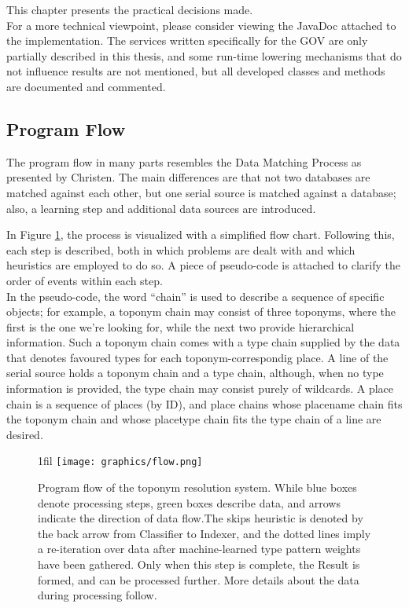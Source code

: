 \documentclass[11pt]{article}
\makeatletter
\newcommand*{\centerfloat}{
  \parindent \z@
  \leftskip \z@ \@plus 1fil \@minus \textwidth
  \rightskip\leftskip
  \parfillskip \z@skip}
\makeatother
\begin{document}
This chapter presents the practical decisions made.\\

For a more technical viewpoint, please consider viewing the JavaDoc attached to the implementation. The services written specifically for the GOV are only partially described in this thesis, and some run-time lowering mechanisms that do not influence results are not mentioned, but all developed classes and methods are documented and commented.

\subsection{Program Flow}

The program flow in many parts resembles the Data Matching Process as presented by Christen. \cite[p. 24]{christen12} The main differences are that not two databases are matched against each other, but one serial source is matched against a database; also, a learning step and additional data sources are introduced.

In Figure \ref{fig:flow}, the process is visualized with a simplified flow chart. Following this, each step is described, both in which problems are dealt with and which heuristics are employed to do so. A piece of pseudo-code is attached to clarify the order of events within each step.\\

In the pseudo-code, the word ``chain'' is used to describe a sequence of specific objects; for example, a toponym chain may consist of three toponyms, where the first is the one we're looking for, while the next two provide hierarchical information. Such a toponym chain comes with a type chain supplied by the data that denotes favoured types for each toponym-correspondig place. A line of the serial source holds a toponym chain and a type chain, although, when no type information is provided, the type chain may consist purely of wildcards. A place chain is a sequence of places (by ID), and place chains whose placename chain fits the toponym chain and whose placetype chain fits the type chain of a line are desired.

\newpage

\begin{figure}[htb!]
  \centerfloat
    \texttt{[image: graphics/flow.png]}
  \caption{Program flow of the toponym resolution system. While blue boxes denote processing steps, green boxes describe data, and arrows indicate the direction of data flow.\newline The skips heuristic is denoted by the back arrow from Classifier to Indexer, and the dotted lines imply a re-iteration over data after machine-learned type pattern weights have been gathered. Only when this step is complete, the Result is formed, and can be processed further. \newline More details about the data during processing follow.}
  \label{fig:flow}
\end{figure}
\end{document}
